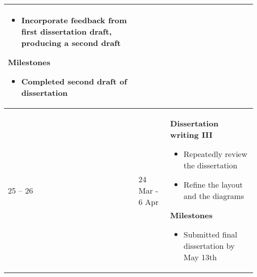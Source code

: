 \documentclass{article}
\begin{document}
\begin{longtable}{m{40pt}m{75pt}m{265pt}}
\begin{itemize}
        \item Incorporate feedback from first dissertation draft, producing a second draft
    \end{itemize}
    \textbf{Milestones}
    \begin{itemize}
        \item Completed second draft of dissertation
    \end{itemize} \\
    \hline
    25 -- 26 & 24 Mar - 6 Apr & %
    \textbf{Dissertation writing III}
    \begin{itemize}
        \item Repeatedly review the dissertation
        \item Refine the layout and the diagrams
    \end{itemize}
    \textbf{Milestones}
    \begin{itemize}
        \item Submitted final dissertation by May 13th
    \end{itemize} \\
    \hline
\end{longtable}





\end{document}
